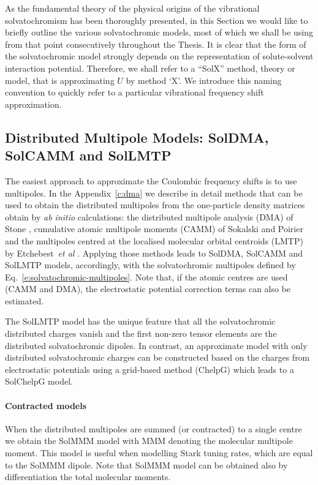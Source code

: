 \documentclass[a4paper,titlepage,twoside,fleqn,12pt]{book}
\begin{document}
\begin{refsection}
As the fundamental theory of the physical origins of the vibrational
solvatochromism has been thoroughly presented, 
in this Section we would like to briefly outline
the various solvatochromic models, most of which 
we shall be using from that point 
consecutively throughout the Thesis. It is clear
that the form of the solvatochromic model strongly depends
on the representation of solute\hyp{}solvent interaction potential.
Therefore, we shall refer to
a ``SolX'' method, theory or model, that is approximating $U$
by method `X'. We introduce this naming convention to quickly refer to a
particular vibrational frequency shift approximation. 


\subsection{Distributed Multipole Models: SolDMA, SolCAMM and SolLMTP\label{s:solx-electrost}}

The easiest approach to approximate the Coulombic frequency shifts
is to use multipoles. In the Appendix~\ref{c:dma}
we describe in detail methods that can be used to obtain
the distributed multipoles from the one\hyp{}particle density matrices
obtain by \emph{ab initio} calculations: the distributed multipole analysis (DMA) of
Stone \citep{Stone.JCTC.2005}, cumulative atomic multipole moments (CAMM)
of Sokalski and Poirier \citep{Sokalski.Poirier.CPL.1983}
and the multipoles centred at the localised molecular orbital centroids (LMTP)
by Etchebest~\emph{et al} \citep{Etchebest.Lavery.Pullman.TheorChimActa.1982}.
Applying those methods leads to SolDMA, SolCAMM and SolLMTP models, accordingly, with the 
solvatochromic multipoles defined by Eq.~\eqref{e:solvatochromic-multipoles}. 
Note that, if the atomic centres are used (CAMM and DMA), the electrostatic potential
correction terms can also be estimated.

The SolLMTP model has the unique feature that all the solvatochromic 
distributed charges vanish and the first non\hyp{}zero tensor elements
are the distributed solvatochromic dipoles. In contrast, an approximate model 
with only distributed solvatochromic charges can be constructed based on the
charges from electrostatic potentials using a grid\hyp{}based 
method \citep{Breneman.Wiberg.JCC.1990} (ChelpG)
which leads to a SolChelpG model.
%
\paragraph{Contracted models\label{p:solx-electrost-contracted}}
When the distributed multipoles are summed (or contracted)
to a single centre we obtain the SolMMM model with MMM denoting 
the molecular multipole moment. This model is useful when
modelling Stark tuning rates, which are equal to
the SolMMM dipole. Note that SolMMM model can be obtained
also by differentiation the total molecular moments.


\end{refsection}
\end{document}
